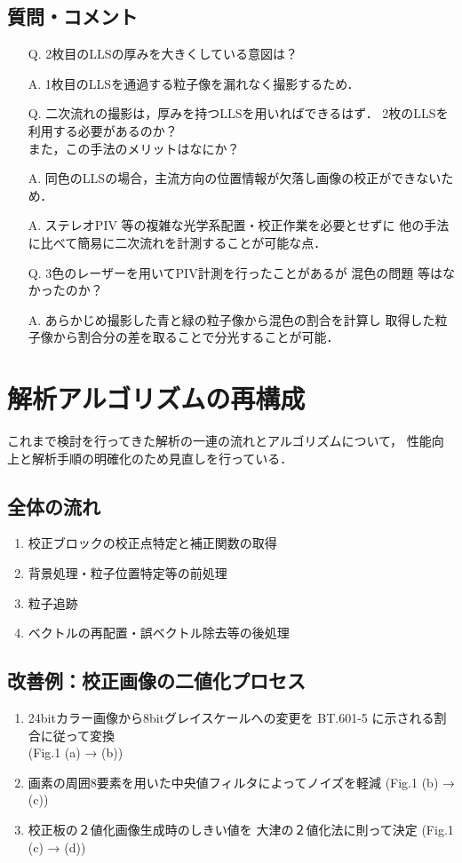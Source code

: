 \documentclass[twocolumn,a4j]{jsarticle}
\begin{document}
\subsection{質問・コメント}
\begin{itemize}
  \item [Q.]2枚目のLLSの厚みを大きくしている意図は？
  \item [A.] 1枚目のLLSを通過する粒子像を漏れなく撮影するため．\\
  \item [Q.]二次流れの撮影は，厚みを持つLLSを用いればできるはず．
        2枚のLLSを利用する必要があるのか？\\
        また，この手法のメリットはなにか？
  \item [A.] 同色のLLSの場合，主流方向の位置情報が欠落し画像の校正ができないため．
  \item [A.] ステレオPIV 等の複雑な光学系配置・校正作業を必要とせずに
        他の手法に比べて簡易に二次流れを計測することが可能な点．\\
  \item [Q.] 3色のレーザーを用いてPIV計測を行ったことがあるが
        混色の問題 等はなかったのか？
  \item [A.] あらかじめ撮影した青と緑の粒子像から混色の割合を計算し
        取得した粒子像から割合分の差を取ることで分光することが可能．
\end{itemize}

\section{解析アルゴリズムの再構成}
これまで検討を行ってきた解析の一連の流れとアルゴリズムについて，
性能向上と解析手順の明確化のため見直しを行っている．

\newpage
\subsection{全体の流れ}
\begin{enumerate}[(1)]
  \item 校正ブロックの校正点特定と補正関数の取得
  \item 背景処理・粒子位置特定等の前処理
  \item 粒子追跡
  \item ベクトルの再配置・誤ベクトル除去等の後処理
\end{enumerate}

\subsection{改善例：校正画像の二値化プロセス}
\begin{enumerate}[(1)]
  \item 24bitカラー画像から8bitグレイスケールへの変更を
        BT.601-5 に示される割合に従って変換\\
        (Fig.1 (a) → (b))
  \item 画素の周囲8要素を用いた中央値フィルタによってノイズを軽減 (Fig.1 (b) → (c))
  \item 校正板の２値化画像生成時のしきい値を
        大津の２値化法に則って決定 (Fig.1 (c) → (d))
\end{enumerate}
\end{document}
